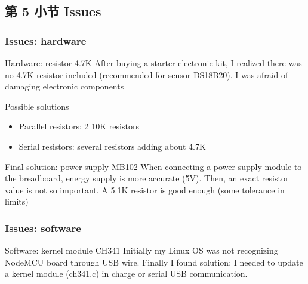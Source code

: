 \documentclass[
    aspectratio=169,                   %
]{beamer}
\begin{document}
\subsection{第 5 小节 Issues}

    \begin{frame}
        \frametitle{Issues: hardware}

        \begin{block}{Hardware: resistor 4.7K}
            After buying a starter electronic kit, I realized there was no 4.7K resistor included (recommended for sensor DS18B20). I was afraid of damaging electronic components
        \end{block}

        \begin{block}{Possible solutions}
            \begin{itemize}
                \item \alert{Parallel resistors}: 2 10K resistors
                \item \alert{Serial resistors}: several resistors adding about 4.7K
            \end{itemize}
        \end{block}

        \begin{block}{Final solution: power supply MB102}
            When connecting a power supply module to the breadboard, energy supply is more accurate (\~5V). Then, an exact resistor value is not so important. A 5.1K resistor is good enough (some tolerance in limits)
        \end{block}

    \end{frame}

    \begin{frame}
        \frametitle{Issues: software}

        \begin{block}{Software: kernel module CH341}
            Initially my Linux OS was not recognizing NodeMCU board through USB wire. Finally I found solution\cite{ch341}: I needed to update a kernel module \alert{(ch341.c)} in charge or serial USB communication.
        \end{block}


        
    \end{frame}
\end{document}
